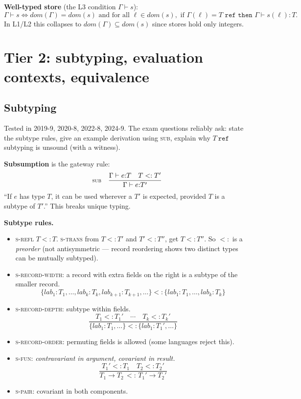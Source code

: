 \documentclass[11pt,a4paper]{article}
\newcommand{\rname}[1]{\textsc{\footnotesize#1}}
\begin{document}
\textbf{Well-typed store} (the L3 condition $\Gamma \vdash s$):
\[
\Gamma \vdash s \iff \mathit{dom}(\Gamma) = \mathit{dom}(s) \text{ and for all } \ell \in \mathit{dom}(s), \text{ if } \Gamma(\ell) = T \texttt{ ref then } \Gamma \vdash s(\ell){:}T.
\]
In L1/L2 this collapses to $\mathit{dom}(\Gamma) \subseteq \mathit{dom}(s)$ since stores hold only integers.

\hrulefill

\section{Tier 2: subtyping, evaluation contexts, equivalence}

\subsection{Subtyping}

\begin{must}
Tested in 2019-9, 2020-8, 2022-8, 2024-9. The exam questions reliably ask: state the subtype rules, give an example derivation using \rname{sub}, explain why $T~\texttt{ref}$ subtyping is unsound (with a witness).
\end{must}

\textbf{Subsumption} is the gateway rule:
\[
\rname{sub}\quad \dfrac{\Gamma \vdash e{:}T \quad T <: T'}{\Gamma \vdash e{:}T'}
\]
``If $e$ has type $T$, it can be used wherever a $T'$ is expected, provided $T$ is a subtype of $T'$.'' This breaks unique typing.

\textbf{Subtype rules.}
\begin{itemize}[leftmargin=*,itemsep=1pt]
  \item \rname{s-refl} $T <: T$. \rname{s-trans} from $T <: T'$ and $T' <: T''$, get $T <: T''$. So $<:$ is a \emph{preorder} (not antisymmetric --- record reordering shows two distinct types can be mutually subtyped).
  \item \rname{s-record-width}: a record with extra fields on the right is a subtype of the smaller record.
  \[ \{\mathit{lab}_1{:}T_1, \ldots, \mathit{lab}_k{:}T_k, \mathit{lab}_{k+1}{:}T_{k+1}, \ldots\} <: \{\mathit{lab}_1{:}T_1, \ldots, \mathit{lab}_k{:}T_k\} \]
  \item \rname{s-record-depth}: subtype within fields.
  \[ \dfrac{T_1 <: T_1' \quad \cdots \quad T_k <: T_k'}{\{\mathit{lab}_1{:}T_1, \ldots\} <: \{\mathit{lab}_1{:}T_1', \ldots\}} \]
  \item \rname{s-record-order}: permuting fields is allowed (some languages reject this).
  \item \rname{s-fun}: \emph{contravariant in argument, covariant in result.}
  \[ \dfrac{T_1' <: T_1 \quad T_2 <: T_2'}{T_1 \to T_2 \,<:\, T_1' \to T_2'} \]
  \item \rname{s-pair}: covariant in both components.
\end{itemize}
\end{document}
